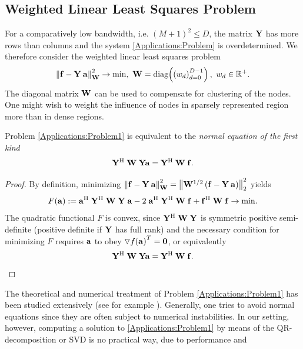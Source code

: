 \subsection{Weighted Linear Least Squares Problem}
  For a comparatively low bandwidth, i.e. $(M+1)^2 \le D$, the matrix $\mathbf{Y}$ 
  has more rows than columns and the system \eqref{Applications:Problem} is 
  overdetermined. We therefore consider the weighted linear least squares 
  problem
    \begin{equation}
      \label{Applications:Problem1}
      \norm{\V{f} - \V{Y}\:\V{a}}_{\V{W}}^2 \rightarrow \text{min},\ \V{W} = 
      \fun{\diag}{\paren{w_{d}}_{d=0}^{D-1}}, \ w_{d} \in \Rp.
    \end{equation}
  The diagonal matrix $\mathbf{W}$ can be used to compensate for clustering of 
  the nodes. One might wish to weight the influence of nodes in sparsely 
  represented region more than in dense regions. 
  \begin{lemma}
    Problem \eqref{Applications:Problem1} is equivalent to the \emph{normal equation of the first kind}
    \begin{equation}
      \label{Applications:NormalEquation1}
      \mathbf{Y^{\text{\rm{H}}}} \; \mathbf{W} \; \mathbf{Y} \mathbf{a} = \mathbf{Y^{\text{\rm{H}}}} \; \mathbf{W} \; \mathbf{f}.
    \end{equation}
  \end{lemma}
  \begin{proof}
    By definition, minimizing $\left\|\mathbf{f} - \mathbf{Y}\:\mathbf{a}\right\|_{\mathbf{W}}^2 = 
    \left\|\mathbf{W}^{1/2}\left(\mathbf{f} - \mathbf{Y}\:\mathbf{a}\right)\right\|_2^2$ yields
    \[
      F{\hspace{-0.4ex}}\left(\mathbf{a}\right) := \mathbf{a}^{\text{\rm{H}}} \; \mathbf{Y}^{\text{\rm{H}}} \; \mathbf{W} \; \mathbf{Y} \; \mathbf{a} - 
      2 \; \mathbf{a}^{\text{\rm{H}}} \; \mathbf{Y}^{\text{\rm{H}}} \; \mathbf{W} \; \mathbf{f} +  \mathbf{f}^{\text{\rm{H}}} \; 
      \mathbf{W} \; \mathbf{f} \rightarrow \text{min}.
    \]
    The quadratic functional $F$ is convex, since 
    $\mathbf{Y}^{\text{\rm{H}}} \; \mathbf{W} \; \mathbf{Y}$ is symmetric positive semi-definite 
    (positive definite if $\mathbf{Y}$ has full rank) and the necessary condition 
    for minimizing $F$ requires $\mathbf{a}$ to obey 
    $\triangledown f{\hspace{-0.4ex}}\left(\mathbf{a}\right)^T = \mathbf{0}$, or equivalently
    \[
      \mathbf{Y^{\text{\rm{H}}}} \; \mathbf{W} \; \mathbf{Y} \mathbf{a} = \mathbf{Y^{\text{\rm{H}}}} \; \mathbf{W} \; \mathbf{f}.
    \]
  \end{proof}
  The theoretical and numerical treatment of Problem \eqref{Applications:Problem1}
  has been studied extensively (see for example \cite{bjoerk}). Generally, one tries to
  avoid normal equations since they are often subject to numerical instabilities. In
  our setting, however, computing a solution to \eqref{Applications:Problem1}
  by means of the QR-decomposition or SVD is no practical way, due to performance and 
